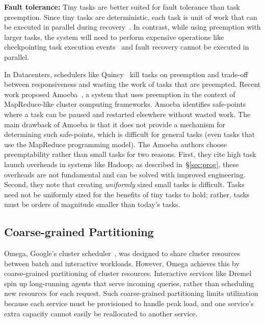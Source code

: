 

\vspace{4pt}\noindent\textbf{Fault tolerance:}
Tiny tasks are better suited for
fault tolerance than task preemption. Since tiny tasks
are deterministic, each task is unit of work that can be executed in parallel
 during recovery~\cite{zaharia2012discretized}.
In contrast, while using 
preemption with larger tasks, the system will need to perform expensive
operations like checkpointing task execution events~\cite{dunlap2002revirt}
and fault recovery cannot be executed in parallel.

In Datacenters, schedulers like Quincy~\cite{isard2009quincy} kill tasks on
preemption and trade-off between responsiveness and wasting the work of tasks
that are preempted.  Recent work proposed Amoeba~\cite{ananthanarayanan2012true},
a system that uses preemption in the context of MapReduce-like
cluster computing frameworks. Amoeba identifies safe-points where a task can be
paused and restarted elsewhere without wasted work. The main drawback of Amoeba
is that it does not provide a mechanism for determining such safe-points, which
is difficult for general tasks (even tasks that use the MapReduce programming
model).  The Amoeba authors choose preemptability rather than small tasks for
two reasons. First, they cite high task launch overheads in systems like
Hadoop; as described in~\S\ref{sec:prog}, these overheads are not fundamental
and can be solved with improved engineering. Second, they note that creating
\emph{uniformly} sized small tasks is difficult. Tasks need not be uniformly
sized for the benefits of tiny tasks to hold; rather, tasks must be orders of
magnitude smaller than today's tasks.

\subsection{Coarse-grained Partitioning}
Omega, Google's cluster scheduler~\cite{melnik2010dremel},
was designed to share cluster
resources between batch and interactive workloads. However, Omega achieves
this by coarse-grained partitioning of cluster resources.
Interactive services like Dremel~\cite{melnik2010dremel} spin up long-running
agents that serve incoming queries, rather than scheduling new resources for
each request.  Such coarse-grained partitioning limits utilization because each service
must be provisioned to handle peak load, and one service's extra capacity
cannot easily be reallocated to another service.

